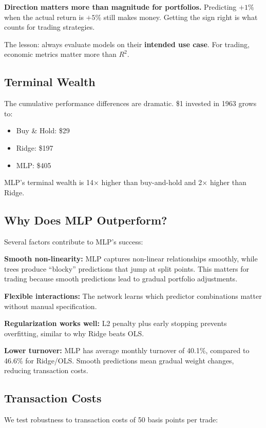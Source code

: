 \documentclass[11pt,a4paper]{article}
\newcommand{\keyword}[1]{\textbf{\textcolor{AccentOrange}{#1}}}
\begin{document}
\textbf{Direction matters more than magnitude for portfolios.} Predicting $+1\%$ when the actual return is $+5\%$ still makes money. Getting the sign right is what counts for trading strategies.

The lesson: always evaluate models on their \keyword{intended use case}. For trading, economic metrics matter more than $R^2$.

\subsection{Terminal Wealth}

The cumulative performance differences are dramatic. \$1 invested in 1963 grows to:
\begin{itemize}
    \item Buy \& Hold: \$29
    \item Ridge: \$197
    \item MLP: \$405
\end{itemize}

MLP's terminal wealth is 14$\times$ higher than buy-and-hold and 2$\times$ higher than Ridge.

\subsection{Why Does MLP Outperform?}

Several factors contribute to MLP's success:

\textbf{Smooth non-linearity:} MLP captures non-linear relationships smoothly, while trees produce ``blocky'' predictions that jump at split points. This matters for trading because smooth predictions lead to gradual portfolio adjustments.

\textbf{Flexible interactions:} The network learns which predictor combinations matter without manual specification.

\textbf{Regularization works well:} L2 penalty plus early stopping prevents overfitting, similar to why Ridge beats OLS.

\textbf{Lower turnover:} MLP has average monthly turnover of 40.1\%, compared to 46.6\% for Ridge/OLS. Smooth predictions mean gradual weight changes, reducing transaction costs.

\subsection{Transaction Costs}

We test robustness to transaction costs of 50 basis points per trade:
\end{document}
